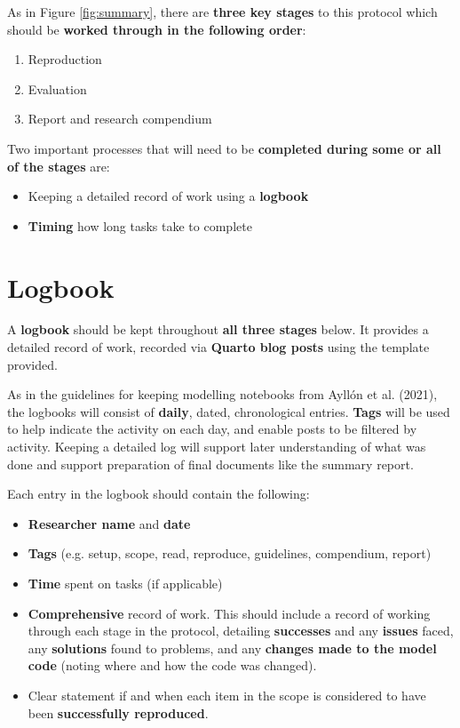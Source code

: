 As in Figure \ref{fig:summary}, there are \textbf{three key stages} to this protocol which should be \textbf{worked through in the following order}:
\begin{enumerate}
    \item Reproduction
    \item Evaluation
    \item Report and research compendium
\end{enumerate}

Two important processes that will need to be \textbf{completed during some or all of the stages} are:
\begin{itemize}
    \item Keeping a detailed record of work using a \textbf{logbook}
    \item \textbf{Timing} how long tasks take to complete
\end{itemize}

\vspace{1cm}
\section{Logbook}

A \textbf{logbook} should be kept throughout \textbf{all three stages} below. It provides a detailed record of work, recorded via \textbf{Quarto blog posts} using the template provided.

As in the guidelines for keeping modelling notebooks from Ayllón et al. (2021),\autocite{ayllon_keeping_2021} the logbooks will consist of \textbf{daily}, dated, chronological entries. \textbf{Tags} will be used to help indicate the activity on each day, and enable posts to be filtered by activity.\autocite{ayllon_keeping_2021} Keeping a detailed log will support later understanding of what was done and support preparation of final documents like the summary report.

Each entry in the logbook should contain the following:
\begin{itemize}
    \item \textbf{Researcher name} and \textbf{date}
    \item \textbf{Tags} (e.g. setup, scope, read, reproduce, guidelines, compendium, report)
    \item \textbf{Time} spent on tasks (if applicable)
    \item \textbf{Comprehensive} record of work. This should include a record of working through each stage in the protocol, detailing \textbf{successes} and any \textbf{issues} faced, any \textbf{solutions} found to problems, and any \textbf{changes made to the model code} (noting where and how the code was changed).
    \item Clear statement if and when each item in the scope is considered to have been \textbf{successfully reproduced}.
\end{itemize}

